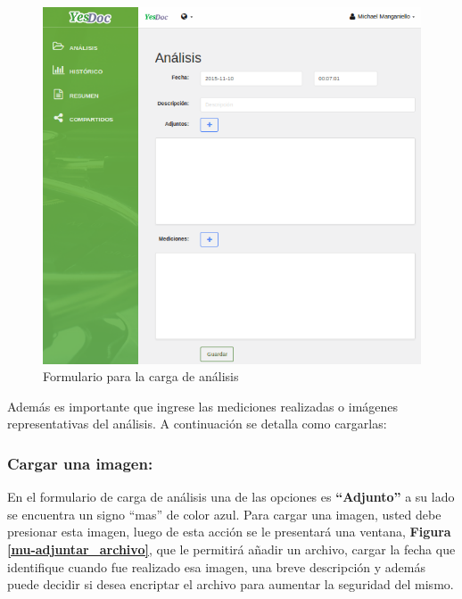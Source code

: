  
 
 \begin{figure}
 	\centering
 	\includegraphics[width=.8\textwidth]{img/manual_de_usuario/mu-cargar_analisis}
 	\caption{Formulario para la carga de análisis}
 	\label{mu-cargar_analisis}
 \end{figure}
 
 Además es importante que ingrese las mediciones realizadas o imágenes representativas del análisis. A continuación se detalla como cargarlas:
 
\subsubsection{Cargar una imagen:} 
 	
 	En el formulario de carga de análisis una de las opciones es \textbf{``Adjunto''} a su lado se encuentra  un signo ``mas'' de color azul. Para cargar una imagen, usted debe presionar esta imagen, luego de esta acción se le presentará una ventana, \textbf{Figura \ref{mu-adjuntar_archivo}}, que le permitirá añadir un archivo, cargar la fecha que identifique cuando fue realizado esa imagen, una breve descripción y además puede decidir si desea encriptar el archivo para aumentar la seguridad del mismo.
 	
